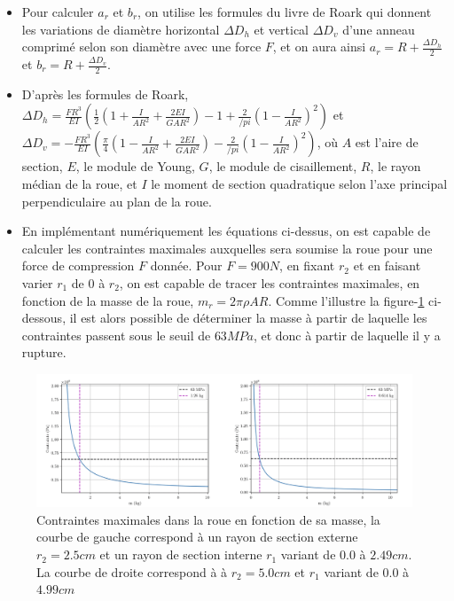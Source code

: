 \begin{itemize}
\begin{itemize}
    \item Pour calculer $a_r$ et $b_r$, on utilise les formules du livre de Roark qui donnent les variations de diamètre horizontal $\Delta D_h$ et vertical $\Delta D_v$ d'une anneau comprimé selon son diamètre avec une force $F$, et on aura ainsi $a_r=R+\frac{\Delta D_h}{2}$ et $b_r=R+\frac{\Delta D_v}{2}$.
    \item D'après les formules de Roark, $\Delta D_h=\frac{FR^3}{EI}(\frac{1}{2}(1+\frac{I}{AR^2}+\frac{2EI}{GAR^2})-1+\frac{2}{/pi}(1-\frac{I}{AR^2})^2)$ et $\Delta D_v=-\frac{FR^3}{EI}(\frac{\pi}{4}(1-\frac{I}{AR^2}+\frac{2EI}{GAR^2})-\frac{2}{/pi}(1-\frac{I}{AR^2})^2)$, où $A$ est l'aire de section, $E$, le module de Young, $G$, le module de cisaillement, $R$, le rayon médian de la roue, et $I$ le moment de section quadratique selon l'axe principal perpendiculaire au plan de la roue.
    \item En implémentant numériquement les équations ci-dessus, on est capable de calculer les contraintes maximales auxquelles sera soumise la roue pour une force de compression $F$ donnée. Pour $F=900N$, en fixant $r_2$ et en faisant varier $r_1$ de $0$ à $r_2$, on est capable de tracer les contraintes maximales, en fonction de la masse de la roue, $m_r=2\pi\rho A R$. Comme l'illustre la figure-\ref{fig:mmin1} ci-dessous, il est alors possible de déterminer la masse à partir de laquelle les contraintes passent sous le seuil de $63 MPa$, et donc à partir de laquelle il y a rupture.
    
\end{itemize}


\begin{figure}[htb]
\centering
\includegraphics[width=7in]{images_2ddl/mmin1.png}
\caption{Contraintes maximales dans la roue en fonction de sa masse, la courbe de gauche correspond à un rayon de section externe $r_2=2.5 cm$ et un rayon de section interne $r_1$ variant de $0.0$ à $2.49 cm$. La courbe de droite correspond à à $r_2=5.0 cm$ et $r_1$ variant de $0.0$ à $4.99 cm$}
\label{fig:mmin1}
\end{figure}



\end{itemize}
